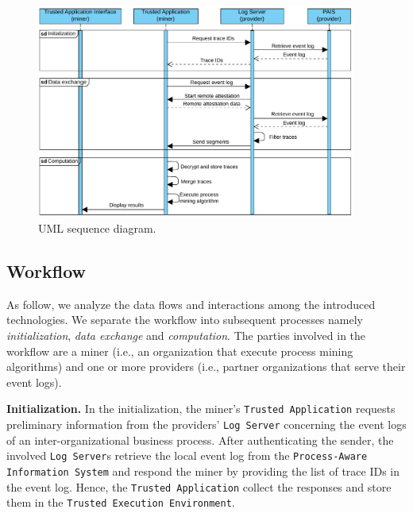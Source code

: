 \begin{figure}[t]
\centering
\includegraphics[width=10.5cm]{content/figures/sequence_diagram.pdf}
\caption{UML sequence diagram.}
\label{fig:sequence_diagram}
\end{figure}
\subsection{Workflow}
As follow, we analyze the data flows and interactions among the introduced technologies. We separate the workflow into subsequent processes namely \textit{initialization}, \textit{data exchange} and \textit{computation}.
The parties involved in the workflow are a miner (i.e., an organization that execute process mining algorithms) and one or more providers (i.e., partner organizations that serve their event logs). %

\textbf{Initialization.} In the initialization, the miner's \texttt{Trusted Application} requests preliminary information from the providers' \texttt{Log Server} concerning the event logs of an inter-organizational business process. After authenticating the sender, the involved \texttt{Log Server}s retrieve the local event log from the \texttt{Process-Aware Information System} and respond the miner by providing the list of trace IDs in the event log. Hence, the \texttt{Trusted Application} collect the responses and store them in the \texttt{Trusted Execution Environment}.

